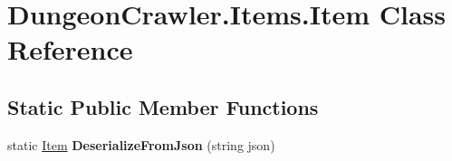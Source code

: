\hypertarget{class_dungeon_crawler_1_1_items_1_1_item}{}\section{Dungeon\+Crawler.\+Items.\+Item Class Reference}
\label{class_dungeon_crawler_1_1_items_1_1_item}
\subsection*{Static Public Member Functions}
\begin{DoxyCompactItemize}
\item 
\hypertarget{class_dungeon_crawler_1_1_items_1_1_item_a59ff285d8d51fcfd3a58e43067538e14}{}static \hyperlink{class_dungeon_crawler_1_1_items_1_1_item}{Item} {\bfseries Deserialize\+From\+Json} (string json)\label{class_dungeon_crawler_1_1_items_1_1_item_a59ff285d8d51fcfd3a58e43067538e14}

\end{DoxyCompactItemize}
